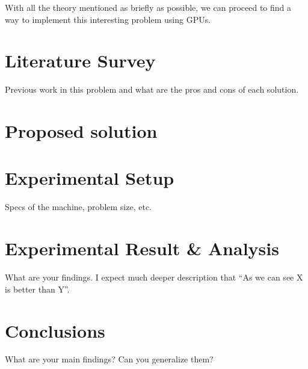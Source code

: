 \documentclass{article}
\begin{document}
With all the theory mentioned as briefly as possible, we can proceed to find a way to implement this interesting problem using GPUs.

\section{Literature Survey}
Previous work in this problem and what are the pros and cons of each solution.
\section{Proposed solution}
\section{Experimental Setup}
Specs of the machine, problem size, etc.
\section{Experimental Result \& Analysis}
What are your findings. I expect much deeper description that ``As we can see X is better than Y''.
\section{Conclusions}
What are your main findings? Can you generalize them?



\end{document}
